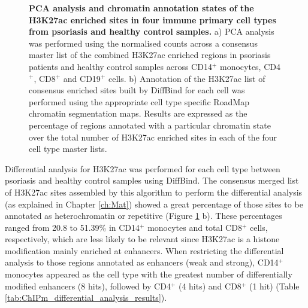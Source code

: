 \begin{figure}[H]
\begin{subfigure}[b]{0.8\textwidth}
\caption{}
\end{subfigure}
\caption[PCA analysis and chromatin annotation states of the H3K27ac enriched sites in four immune primary cell types from psoriasis and healthy control samples.]{\textbf{PCA analysis and chromatin annotation states of the H3K27ac enriched sites in four immune primary cell types from psoriasis and healthy control samples.} a) PCA analysis was performed using the normalised counts across a consensus master list of the combined H3K27ac enriched regions in psoriasis patients and healthy control samples across CD14$^+$ monocytes, CD4$^+$, CD8$^+$ and CD19$^+$ cells. b) Annotation of the H3K27ac list of consensus enriched sites built by DiffBind for each cell was performed using the appropriate cell type specific RoadMap chromatin segmentation maps. Results are expressed as the percentage of regions annotated with a particular chromatin state over the total number of H3K27ac enriched sites in each of the four cell type master lists.}
\label{figure:ChIPm_PCA_and_chromatin_states}
\end{figure}



Differential analysis for H3K27ac was performed for each cell type between psoriasis and healthy control samples using DiffBind. The consensus merged list of H3K27ac sites assembled by this algorithm to perform the differential analysis (as explained in Chapter \ref{ch:Mat}) showed a great percentage of those sites to be annotated as heterochromatin or repetitive (Figure \ref{figure:ChIPm_PCA_and_chromatin_states} b). These percentages ranged from 20.8 to 51.39\% in CD14$^+$ monocytes and total CD8$^+$ cells, respectively, which are less likely to be relevant since H3K27ac is a histone modification mainly enriched at enhancers. When restricting the differential analysis to those regions annotated as enhancers (weak and strong), CD14$^+$ monocytes appeared as the cell type with the greatest number of differentially modified enhancers (8 hits), followed by CD4$^+$ (4 hits) and CD8$^+$ (1 hit) (Table \ref{tab:ChIPm_differential_analysis_results}).



